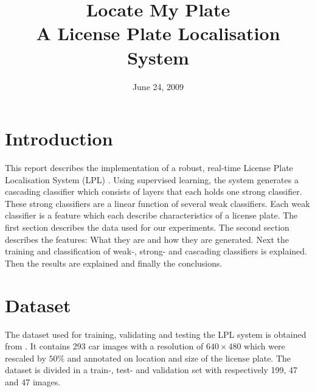 \documentclass[a4paper,11pt]{article}
\title{Locate My Plate \\ A License Plate Localisation System}
\date{June 24, 2009}
\begin{document}
\maketitle
\section*{Introduction}
This report describes the implementation of a robust, real-time License Plate
Localisation System (LPL) \cite{dlagnekov_thesis, zhang}. Using supervised
learning, the system generates a cascading classifier which consists of layers
that each holds one strong classifier. These strong classifiers are a linear
function of several weak classifiers. Each weak classifier is a feature which
each describe characteristics of a license plate. The first section describes
the data used for our experiments. The second section describes the features:
What they are and how they are generated.  Next the training and classification
of weak-, strong- and cascading classifiers is explained. Then the results are
explained and finally the conclusions.

\section*{Dataset}
The dataset used for training, validating and testing the LPL system is obtained
from \cite{dlagnekov_dataset}. It contains 293 car images with a resolution of
$640\times480$ which were rescaled by $50\%$ and annotated on location and size of
the license plate. The dataset is divided in a train-, test- and validation set
with respectively 199, 47 and 47 images.
\end{document}
